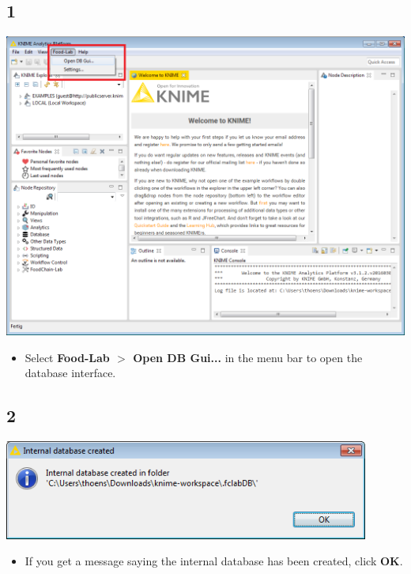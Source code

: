 \documentclass{beamer}
\begin{document}
\subsection{1}
\begin{frame}
	\begin{center}
  		\includegraphics[height=0.6\textheight]{1.png}
	\end{center}
	\begin{itemize}
		\item Select \textbf{Food-Lab $>$ Open DB Gui...} in the menu bar to open the database interface.
	\end{itemize}
\end{frame}

\subsection{2}
\begin{frame}
	\begin{center}
  		\includegraphics[width=0.9\textwidth]{2.png}
	\end{center}
	\begin{itemize}
		\item If you get a message saying the internal database has been created, click \textbf{OK}.
	\end{itemize}
\end{frame}
\end{document}
